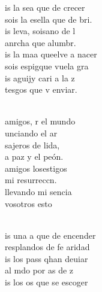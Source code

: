 \documentclass[12pt]{article}
\begin{document}
\begin{multicols*}{2}
\begin{cancion}[Id y enseñad][Garabaín]%
	is la sea que de crecer\\
	sois la esella que de bri.\\
	is leva, soisano de l\\
	anrcha que  alumbr.\\
	is la maa queelve a nacer\\
	sois espigque vuela gra\\
	is aguijy cari a la z\\
	tesgos que v enviar.\\\jump\\
	\begin{chorus}%
	amigos, r el mundo\\
	unciando el ar\\
	sajeros de lida,\\
	a paz y el peón.\\
	amigos losestigos\\
	 mi resurreccn. \\
	llevando mi sencia\\
	vosotros esto\\
	\end{chorus}%
	\jump\\
	is una a que de encender\\
	resplandos de fe aridad\\
	is los pass qhan deuiar\\
	al mdo por as de z\\
	is los os que se escoger\\

\end{cancion}
\end{multicols*}
\end{document}
